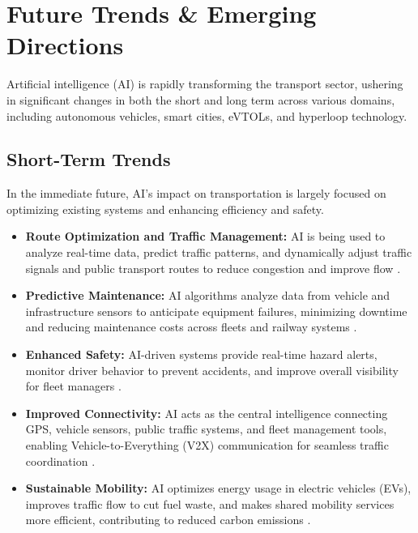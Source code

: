 \section{Future Trends \& Emerging Directions}

Artificial intelligence (AI) is rapidly transforming the transport sector, ushering in significant changes in both the short and long term across various domains, including autonomous vehicles, smart cities, eVTOLs, and hyperloop technology.

\subsection{Short-Term Trends}
In the immediate future, AI's impact on transportation is largely focused on optimizing existing systems and enhancing efficiency and safety.
\begin{itemize}
    \item \textbf{Route Optimization and Traffic Management:} AI is being used to analyze real-time data, predict traffic patterns, and dynamically adjust traffic signals and public transport routes to reduce congestion and improve flow \cite{PTVGroup_FutureTrends, RSTSoftware_FutureTrends}.
    \item \textbf{Predictive Maintenance:} AI algorithms analyze data from vehicle and infrastructure sensors to anticipate equipment failures, minimizing downtime and reducing maintenance costs across fleets and railway systems \cite{Prismetric_FutureTrends, NextMSC_FutureTrends}.
    \item \textbf{Enhanced Safety:} AI-driven systems provide real-time hazard alerts, monitor driver behavior to prevent accidents, and improve overall visibility for fleet managers \cite{API4AI_FutureTrends}.
    \item \textbf{Improved Connectivity:} AI acts as the central intelligence connecting GPS, vehicle sensors, public traffic systems, and fleet management tools, enabling Vehicle-to-Everything (V2X) communication for seamless traffic coordination \cite{StartusInsights_FutureTrends, AutomateOrg_FutureTrends}.
    \item \textbf{Sustainable Mobility:} AI optimizes energy usage in electric vehicles (EVs), improves traffic flow to cut fuel waste, and makes shared mobility services more efficient, contributing to reduced carbon emissions \cite{InnovationNewsNetwork_FutureTrends}.
\end{itemize}

